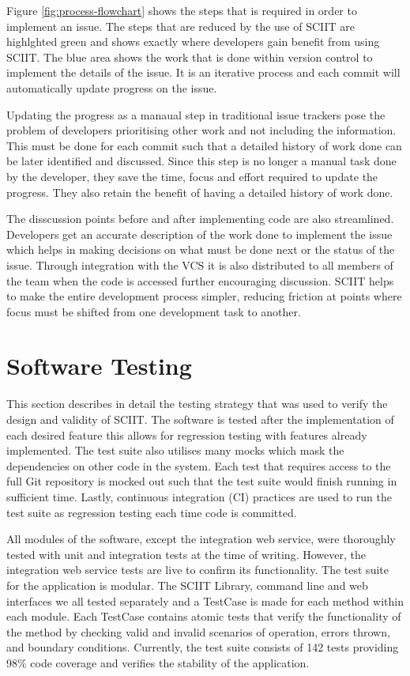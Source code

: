 \documentclass{mproj}
\begin{document}
Figure \ref{fig:process-flowchart} shows the steps that is required in order to implement an issue. The steps that are reduced by the use of SCIIT are highlghted green and shows exactly where developers gain benefit from using SCIIT. The blue area shows the work that is done within version control to implement the details of the issue. It is an iterative process and each commit will automatically update progress on the issue.

Updating the progress as a manaual step in traditional issue trackers pose the problem of developers prioritising other work and not including the information. This must be done for each commit such that a detailed history of work done can be later identified and discussed. Since this step is no longer a manual task done by the developer, they save the time, focus and effort required to update the progress. They also retain the benefit of having a detailed history of work done.

The disscussion points before and after implementing code are also streamlined. Developers get an accurate description of the work done to implement the issue which helps in making decisions on what must be done next or the status of the issue. Through integration with the VCS it is also distributed to all members of the team when the code is accessed further encouraging discussion. SCIIT helps to make the entire development process simpler, reducing friction at points where focus must be shifted from one development task to another.

\section{Software Testing} 

This section describes in detail the testing strategy that was used to verify the design and validity of SCIIT. The software is tested after the implementation of each desired feature this allows for regression testing with features already implemented. The test suite also utilises many mocks which mask the dependencies on other code in the system. Each test that requires access to the full Git repository is mocked out such that the test suite would finish running in sufficient time. Lastly, continuous integration (CI) practices are used to run the test suite as regression testing each time code is committed.

All modules of the software, except the integration web service, were thoroughly tested with unit and integration tests at the time of writing. However, the integration web service tests are live to confirm its functionality. The test suite for the application is modular. The SCIIT Library, command line and web interfaces we all tested separately and a TestCase is made for each method within each module. Each TestCase contains atomic tests that verify the functionality of the method by checking valid and invalid scenarios of operation, errors thrown, and boundary conditions. Currently, the test suite consists of 142 tests providing 98\% code coverage and verifies the stability of the application.
\end{document}
